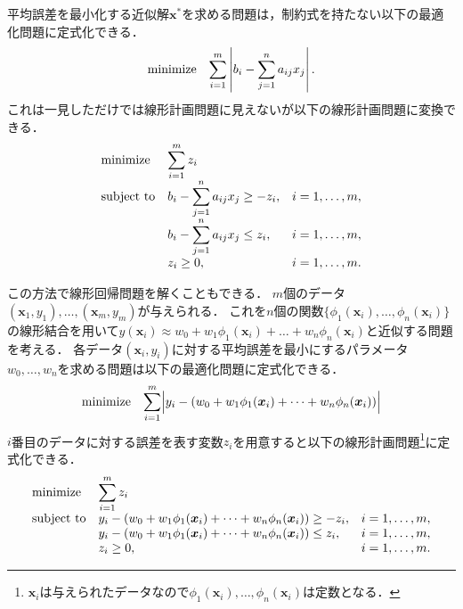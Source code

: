 \documentclass[japanese]{jnlp_1.4}
\begin{document}
平均誤差を最小化する近似解$\bm{x}^{\ast}$を求める問題は，制約式を持たない以下の最適化問題に定式化できる．
\begin{equation}
\begin{array}{ll}
\textnormal{minimize} & \displaystyle\sum_{i=1}^m \left| b_i - \sum_{j=1}^n a_{ij} x_j \right|.
\end{array}
\end{equation}
これは一見しただけでは線形計画問題に見えないが以下の線形計画問題に変換できる．
\begin{equation}
\begin{array}{lll}
\textnormal{minimize} & \displaystyle\sum_{i=1}^m z_i & \\
\textnormal{subject to} & b_i - \displaystyle\sum_{j=1}^n a_{ij} x_j \ge -z_i, & i=1,\dots,m,\\
 & b_i - \displaystyle\sum_{j=1}^n a_{ij} x_j \le z_i, & i=1,\dots,m,\\
 & z_i \ge 0, & i=1,\dots,m.
\end{array}
\end{equation}

この方法で線形回帰問題を解くこともできる．
$m$個のデータ$(\bm{x}_1,y_1),\dots,(\bm{x}_m,y_m)$が与えられる．
これを$n$個の関数$\{ \phi_1(\bm{x}_i), \dots, \phi_n(\bm{x}_i) \}$の線形結合を用いて$y(\bm{x}_i) \approx w_0 + w_1 \phi_1(\bm{x}_i) + \dots + w_n \phi_n(\bm{x}_i)$と近似する問題を考える．
各データ$(\bm{x}_i,y_i)$に対する平均誤差を最小にするパラメータ$w_0, \dots, w_n$を求める問題は以下の最適化問題に定式化できる．
\begin{equation}
\begin{array}{ll}
\textnormal{minimize} & \displaystyle\sum_{i=1}^m \Bigl| y_i - \left( w_0 + w_1 \phi_1(\bm{x}_i) + \dots + w_n \phi_n(\bm{x}_i) \right) \Bigr|
\end{array}
\end{equation}
$i$番目のデータに対する誤差を表す変数$z_i$を用意すると以下の線形計画問題\footnote{$\bm{x}_i$は与えられたデータなので$\phi_1(\bm{x}_i), \dots, \phi_n(\bm{x}_i)$は定数となる．}に定式化できる．
\pagebreak
\begin{equation}
\begin{array}{lll}
\textnormal{minimize} & \displaystyle\sum_{i=1}^m z_i & \\
\textnormal{subject to} & y_i - \left( w_0 + w_1 \phi_1(\bm{x}_i) + \dots + w_n \phi_n(\bm{x}_i) \right) \ge -z_i, & i=1,\dots,m,\\
& y_i - \left( w_0 + w_1 \phi_1(\bm{x}_i) + \dots + w_n \phi_n(\bm{x}_i) \right) \le z_i, & i=1,\dots,m,\\
& z_i \ge 0, & i=1,\dots,m.
\end{array}
\end{equation}
\end{document}

